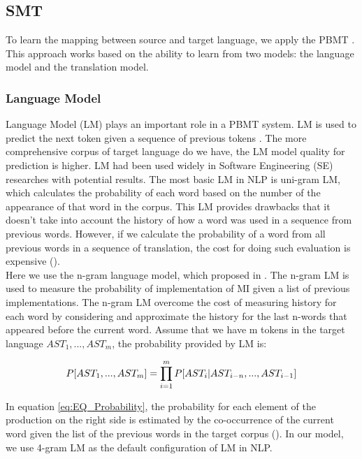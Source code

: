\subsection{SMT}
To learn the mapping between source and target language, we apply the PBMT \cite{Green2014}. This approach works based on the ability to learn from two models: the language model and the translation model.
\subsubsection{Language Model}
Language Model (LM) plays an important role in a PBMT system. LM is used to predict the next token given a sequence of previous tokens \cite{Koehn:2003:SPT:1073445.1073462}. The more comprehensive corpus of target language do we have, the LM model quality for prediction is higher. LM had been used widely in Software Engineering (SE) researches \cite{Hindle:2012:NS:2337223.2337322,Hel:7180076,Liu:7883371} with potential results. The most basic LM in NLP is uni-gram LM, which calculates the probability of each word based on the number of the appearance of that word in the corpus. This LM provides drawbacks that it doesn't take into account the history of how a word was used in a sequence from previous words. However, if we calculate the probability of a word from all previous words in a sequence of translation, the cost for doing such evaluation is expensive (\cite{Jurafsky:2009:SLP:1214993}). 
\\
Here we use the n-gram language model, which proposed in \cite{Jurafsky:2009:SLP:1214993}. The n-gram LM is used to measure the probability of implementation of MI given a list of previous implementations. The n-gram LM overcome the cost of measuring history for each word by considering and approximate the history for the last n-words that appeared before the current word. Assume that we have m tokens in the target language \({AST_{1},...,AST_{m}}\), the probability provided by LM is:

\begin{equation} 
\tiny
\label{eq:EQ_Probability}
 P[AST_{1}, ...,AST_{m}]=\prod_{i=1}^{m}P[AST_{i} | AST_{i-n},...,AST_{i-1}]
\end{equation}

In equation \ref{eq:EQ_Probability}, the probability for each element of the production on the right side is estimated by the co-occurrence of the current word given the list of the previous words in the target corpus (\cite{Jurafsky:2009:SLP:1214993}). In our model, we use 4-gram LM as the default configuration of LM in NLP.

